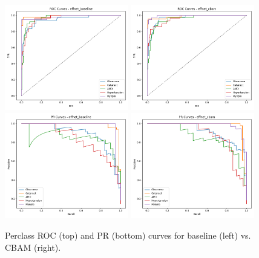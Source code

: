 \begin{figure}[t]
  \centering
  \includegraphics[width=0.48\textwidth]{../new_work/figures/roc_curves_effnet_baseline.png}
  \includegraphics[width=0.48\textwidth]{../new_work/figures/roc_curves_effnet_cbam.png}\\
  \includegraphics[width=0.48\textwidth]{../new_work/figures/pr_curves_effnet_baseline.png}
  \includegraphics[width=0.48\textwidth]{../new_work/figures/pr_curves_effnet_cbam.png}
  \caption{Per\textendash class ROC (top) and PR (bottom) curves for baseline (left) vs. CBAM (right).}
  \label{fig:perclass_curves}
\end{figure}

